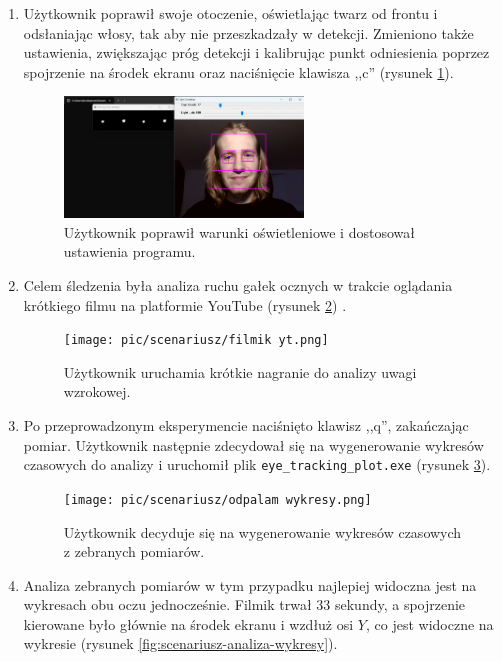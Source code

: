 \documentclass[a4paper,twoside,12pt]{book}
\begin{document}
\begin{enumerate}
	\item Użytkownik poprawił swoje otoczenie, oświetlając twarz od frontu i odsłaniając
	włosy, tak aby nie przeszkadzały w detekcji. Zmieniono także ustawienia, zwiększając
	próg detekcji i kalibrując punkt odniesienia poprzez spojrzenie na środek ekranu
	oraz naciśnięcie klawisza ,,c'' (rysunek \ref{fig:scenariusz-poprawione-swiatlo}).
	
	\begin{figure}[H]
		\centering
		\includegraphics[width=0.6\textwidth]{pic/scenariusz/poprawienie śledzenia.png}
		\caption{Użytkownik poprawił warunki oświetleniowe i dostosował ustawienia programu.}
		\label{fig:scenariusz-poprawione-swiatlo}
	\end{figure}

	\item Celem śledzenia była analiza ruchu gałek ocznych w trakcie oglądania krótkiego
	filmu na platformie YouTube (rysunek \ref{fig:scenariusz-yt}) \cite{bib:youtube}.
	
	\begin{figure}[H]
		\centering
		\texttt{[image: pic/scenariusz/filmik yt.png]}
		\caption{Użytkownik uruchamia krótkie nagranie do analizy uwagi wzrokowej.}
		\label{fig:scenariusz-yt}
	\end{figure}

	\item Po przeprowadzonym eksperymencie naciśnięto klawisz ,,q'', zakańczając pomiar.
	Użytkownik następnie zdecydował się na wygenerowanie wykresów czasowych do
	analizy i uruchomił plik \texttt{eye\_\-tracking\_\-plot.exe} (rysunek \ref{fig:scenariusz-odpalanie-wykresy}).
	
	\begin{figure}[H]
		\centering
		\texttt{[image: pic/scenariusz/odpalam wykresy.png]}
		\caption{Użytkownik decyduje się na wygenerowanie wykresów czasowych z zebranych pomiarów.}
		\label{fig:scenariusz-odpalanie-wykresy}
	\end{figure}

	\item Analiza zebranych pomiarów w tym przypadku najlepiej widoczna jest na wykresach
	obu oczu jednocześnie. Filmik trwał $33$ sekundy, a spojrzenie kierowane było głównie
	na środek ekranu i wzdłuż osi $Y$, co jest widoczne na wykresie (rysunek \ref{fig:scenariusz-analiza-wykresy}).
	

\end{enumerate}
\end{document}
